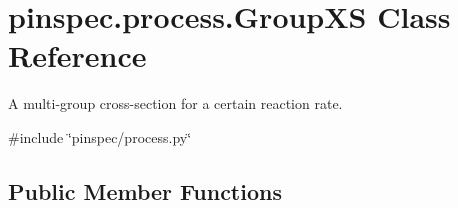 \hypertarget{classpinspec_1_1process_1_1GroupXS}{\section{pinspec.\-process.\-Group\-X\-S Class Reference}
\label{classpinspec_1_1process_1_1GroupXS}
}


A multi-\/group cross-\/section for a certain reaction rate.  




{\ttfamily \#include \char`\"{}pinspec/process.\-py\char`\"{}}

\subsection*{Public Member Functions}
